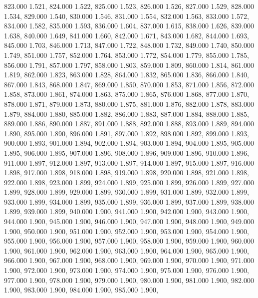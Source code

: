 823.000 1.521, 
824.000 1.522, 
825.000 1.523, 
826.000 1.526, 
827.000 1.529, 
828.000 1.534, 
829.000 1.540, 
830.000 1.546, 
831.000 1.554, 
832.000 1.563, 
833.000 1.572, 
834.000 1.582, 
835.000 1.593, 
836.000 1.604, 
837.000 1.615, 
838.000 1.626, 
839.000 1.638, 
840.000 1.649, 
841.000 1.660, 
842.000 1.671, 
843.000 1.682, 
844.000 1.693, 
845.000 1.703, 
846.000 1.713, 
847.000 1.722, 
848.000 1.732, 
849.000 1.740, 
850.000 1.749, 
851.000 1.757, 
852.000 1.764, 
853.000 1.772, 
854.000 1.779, 
855.000 1.785, 
856.000 1.791, 
857.000 1.797, 
858.000 1.803, 
859.000 1.809, 
860.000 1.814, 
861.000 1.819, 
862.000 1.823, 
863.000 1.828, 
864.000 1.832, 
865.000 1.836, 
866.000 1.840, 
867.000 1.843, 
868.000 1.847, 
869.000 1.850, 
870.000 1.853, 
871.000 1.856, 
872.000 1.858, 
873.000 1.861, 
874.000 1.863, 
875.000 1.865, 
876.000 1.868, 
877.000 1.870, 
878.000 1.871, 
879.000 1.873, 
880.000 1.875, 
881.000 1.876, 
882.000 1.878, 
883.000 1.879, 
884.000 1.880, 
885.000 1.882, 
886.000 1.883, 
887.000 1.884, 
888.000 1.885, 
889.000 1.886, 
890.000 1.887, 
891.000 1.888, 
892.000 1.888, 
893.000 1.889, 
894.000 1.890, 
895.000 1.890, 
896.000 1.891, 
897.000 1.892, 
898.000 1.892, 
899.000 1.893, 
900.000 1.893, 
901.000 1.894, 
902.000 1.894, 
903.000 1.894, 
904.000 1.895, 
905.000 1.895, 
906.000 1.895, 
907.000 1.896, 
908.000 1.896, 
909.000 1.896, 
910.000 1.896, 
911.000 1.897, 
912.000 1.897, 
913.000 1.897, 
914.000 1.897, 
915.000 1.897, 
916.000 1.898, 
917.000 1.898, 
918.000 1.898, 
919.000 1.898, 
920.000 1.898, 
921.000 1.898, 
922.000 1.898, 
923.000 1.899, 
924.000 1.899, 
925.000 1.899, 
926.000 1.899, 
927.000 1.899, 
928.000 1.899, 
929.000 1.899, 
930.000 1.899, 
931.000 1.899, 
932.000 1.899, 
933.000 1.899, 
934.000 1.899, 
935.000 1.899, 
936.000 1.899, 
937.000 1.899, 
938.000 1.899, 
939.000 1.899, 
940.000 1.900, 
941.000 1.900, 
942.000 1.900, 
943.000 1.900, 
944.000 1.900, 
945.000 1.900, 
946.000 1.900, 
947.000 1.900, 
948.000 1.900, 
949.000 1.900, 
950.000 1.900, 
951.000 1.900, 
952.000 1.900, 
953.000 1.900, 
954.000 1.900, 
955.000 1.900, 
956.000 1.900, 
957.000 1.900, 
958.000 1.900, 
959.000 1.900, 
960.000 1.900, 
961.000 1.900, 
962.000 1.900, 
963.000 1.900, 
964.000 1.900, 
965.000 1.900, 
966.000 1.900, 
967.000 1.900, 
968.000 1.900, 
969.000 1.900, 
970.000 1.900, 
971.000 1.900, 
972.000 1.900, 
973.000 1.900, 
974.000 1.900, 
975.000 1.900, 
976.000 1.900, 
977.000 1.900, 
978.000 1.900, 
979.000 1.900, 
980.000 1.900, 
981.000 1.900, 
982.000 1.900, 
983.000 1.900, 
984.000 1.900, 
985.000 1.900, 
